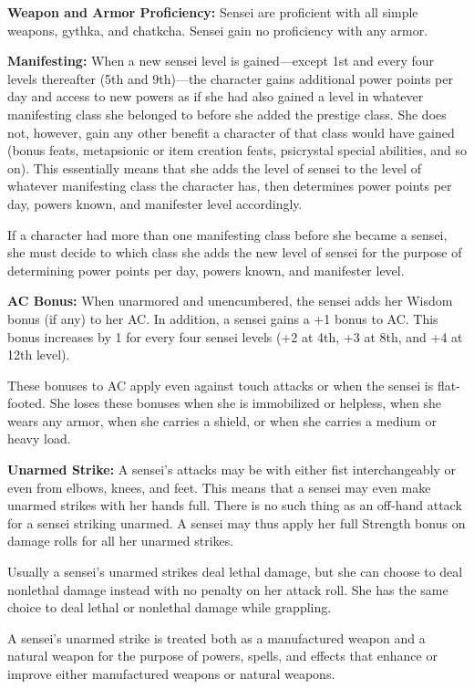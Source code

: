 {
\textbf{Weapon and Armor Proficiency:} Sensei are proficient with all simple weapons, gythka, and chatkcha. Sensei gain no proficiency with any armor.

\textbf{Manifesting:} When a new sensei level is gained---except 1st and every four levels thereafter (5th and 9th)---the character gains additional power points per day and access to new powers as if she had also gained a level in whatever manifesting class she belonged to before she added the prestige class. She does not, however, gain any other benefit a character of that class would have gained (bonus feats, metapsionic or item creation feats, psicrystal special abilities, and so on). This essentially means that she adds the level of sensei to the level of whatever manifesting class the character has, then determines power points per day, powers known, and manifester level accordingly.

If a character had more than one manifesting class before she became a sensei, she must decide to which class she adds the new level of sensei for the purpose of determining power points per day, powers known, and manifester level.

\textbf{AC Bonus:} When unarmored and unencumbered, the sensei adds her Wisdom bonus (if any) to her AC. In addition, a sensei gains a +1 bonus to AC. This bonus increases by 1 for every four sensei levels (+2 at 4th, +3 at 8th, and +4 at 12th level).

These bonuses to AC apply even against touch attacks or when the sensei is flat-footed. She loses these bonuses when she is immobilized or helpless, when she wears any armor, when she carries a shield, or when she carries a medium or heavy load.

\textbf{Unarmed Strike:} A sensei's attacks may be with either fist interchangeably or even from elbows, knees, and feet. This means that a sensei may even make unarmed strikes with her hands full. There is no such thing as an off-hand attack for a sensei striking unarmed. A sensei may thus apply her full Strength bonus on damage rolls for all her unarmed strikes.

Usually a sensei's unarmed strikes deal lethal damage, but she can choose to deal nonlethal damage instead with no penalty on her attack roll. She has the same choice to deal lethal or nonlethal damage while grappling.

A sensei's unarmed strike is treated both as a manufactured weapon and a natural weapon for the purpose of powers, spells, and effects that enhance or improve either manufactured weapons or natural weapons.

}
